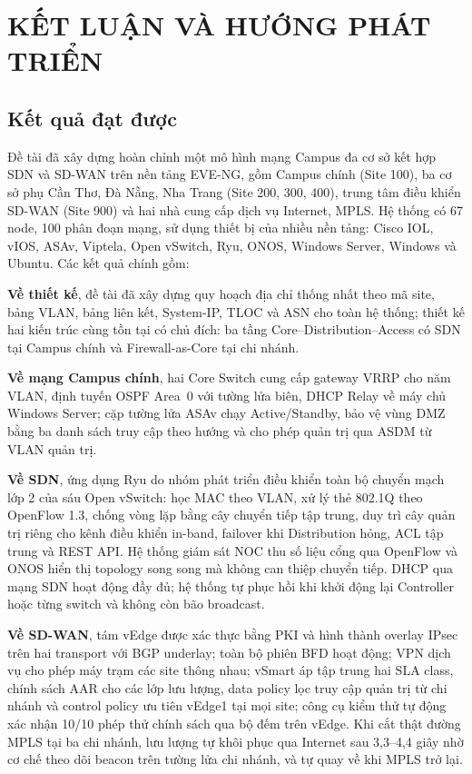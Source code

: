 \section{KẾT LUẬN VÀ HƯỚNG PHÁT TRIỂN}\label{sec:ket_luan_huong_phat_trien}

\subsection{Kết quả đạt được}

Đề tài đã xây dựng hoàn chỉnh một mô hình mạng Campus đa cơ sở kết hợp SDN và SD-WAN trên nền tảng EVE-NG, gồm Campus chính (Site 100), ba cơ sở phụ Cần Thơ, Đà Nẵng, Nha Trang (Site 200, 300, 400), trung tâm điều khiển SD-WAN (Site 900) và hai nhà cung cấp dịch vụ Internet, MPLS. Hệ thống có 67 node, 100 phân đoạn mạng, sử dụng thiết bị của nhiều nền tảng: Cisco IOL, vIOS, ASAv, Viptela, Open vSwitch, Ryu, ONOS, Windows Server, Windows và Ubuntu. Các kết quả chính gồm:

\textbf{Về thiết kế}, đề tài đã xây dựng quy hoạch địa chỉ thống nhất theo mã site, bảng VLAN, bảng liên kết, System-IP, TLOC và ASN cho toàn hệ thống; thiết kế hai kiến trúc cùng tồn tại có chủ đích: ba tầng Core--Distribution--Access có SDN tại Campus chính và Firewall-as-Core tại chi nhánh.

\textbf{Về mạng Campus chính}, hai Core Switch cung cấp gateway VRRP cho năm VLAN, định tuyến OSPF Area~0 với tường lửa biên, DHCP Relay về máy chủ Windows Server; cặp tường lửa ASAv chạy Active/Standby, bảo vệ vùng DMZ bằng ba danh sách truy cập theo hướng và cho phép quản trị qua ASDM từ VLAN quản trị.

\textbf{Về SDN}, ứng dụng Ryu do nhóm phát triển điều khiển toàn bộ chuyển mạch lớp 2 của sáu Open vSwitch: học MAC theo VLAN, xử lý thẻ 802.1Q theo OpenFlow 1.3, chống vòng lặp bằng cây chuyển tiếp tập trung, duy trì cây quản trị riêng cho kênh điều khiển in-band, failover khi Distribution hỏng, ACL tập trung và REST API. Hệ thống giám sát NOC thu số liệu cổng qua OpenFlow và ONOS hiển thị topology song song mà không can thiệp chuyển tiếp. DHCP qua mạng SDN hoạt động đầy đủ; hệ thống tự phục hồi khi khởi động lại Controller hoặc từng switch và không còn bão broadcast.

\textbf{Về SD-WAN}, tám vEdge được xác thực bằng PKI và hình thành overlay IPsec trên hai transport với BGP underlay; toàn bộ phiên BFD hoạt động; VPN dịch vụ cho phép máy trạm các site thông nhau; vSmart áp tập trung hai SLA class, chính sách AAR cho các lớp lưu lượng, data policy lọc truy cập quản trị từ chi nhánh và control policy ưu tiên vEdge1 tại mọi site; công cụ kiểm thử tự động xác nhận 10/10 phép thử chính sách qua bộ đếm trên vEdge. Khi cắt thật đường MPLS tại ba chi nhánh, lưu lượng tự khôi phục qua Internet sau 3,3--4,4 giây nhờ cơ chế theo dõi beacon trên tường lửa chi nhánh, và tự quay về khi MPLS trở lại.

